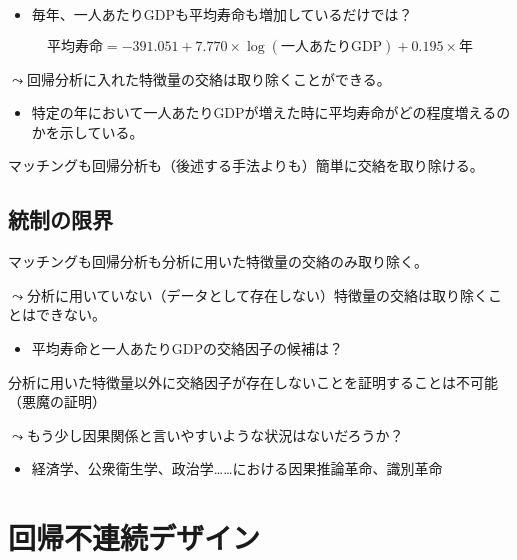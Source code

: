 \documentclass[
  xelatex,
  ja=standard]{bxjsarticle}
\providecommand{\tightlist}{%
  \setlength{\itemsep}{0pt}\setlength{\parskip}{0pt}}\usepackage{longtable,booktabs,array}
\begin{document}
\begin{itemize}
\tightlist
\item
  毎年、一人あたりGDPも平均寿命も増加しているだけでは？
\end{itemize}

\[
\textrm{平均寿命} = -391.051 + 7.770 \times \log(\textrm{一人あたりGDP}) + 0.195 \times \textrm{年}
\]

\(\leadsto\)回帰分析に入れた特徴量の交絡は取り除くことができる。

\begin{itemize}
\tightlist
\item
  特定の年において一人あたりGDPが増えた時に平均寿命がどの程度増えるのかを示している。
\end{itemize}

マッチングも回帰分析も（後述する手法よりも）簡単に交絡を取り除ける。

\hypertarget{ux7d71ux5236ux306eux9650ux754c}{%
\subsection{統制の限界}\label{ux7d71ux5236ux306eux9650ux754c}}

マッチングも回帰分析も分析に用いた特徴量の交絡のみ取り除く。

\(\leadsto\)分析に用いていない（データとして存在しない）特徴量の交絡は取り除くことはできない。

\begin{itemize}
\tightlist
\item
  平均寿命と一人あたりGDPの交絡因子の候補は？
\end{itemize}

分析に用いた特徴量以外に交絡因子が存在しないことを証明することは不可能（悪魔の証明）

\(\leadsto\)もう少し因果関係と言いやすいような状況はないだろうか？

\begin{itemize}
\tightlist
\item
  経済学、公衆衛生学、政治学\ldots\ldots における因果推論革命、識別革命
\end{itemize}

\hypertarget{ux56deux5e30ux4e0dux9023ux7d9aux30c7ux30b6ux30a4ux30f3}{%
\section{回帰不連続デザイン}\label{ux56deux5e30ux4e0dux9023ux7d9aux30c7ux30b6ux30a4ux30f3}}
\end{document}

